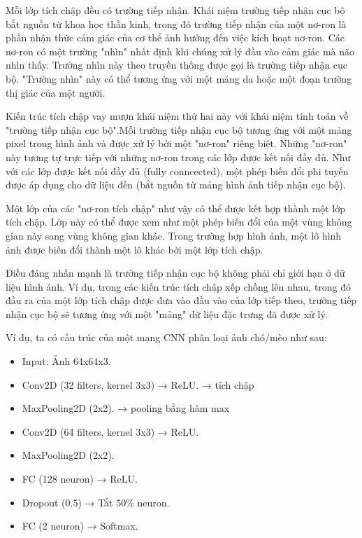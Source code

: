 \documentclass[../main.tex]{subfiles}
\begin{document}
Mỗi lớp tích chập đều có trường tiếp nhận. Khái niệm trường tiếp nhận cục bộ bắt nguồn từ khoa học thần kinh, trong đó trường tiếp nhận của một nơ-ron là phần nhận thức cảm giác của cơ thể ảnh hưởng đến việc kích hoạt nơ-ron. Các nơ-ron có một trường "nhìn" nhất định khi chúng xử lý đầu vào cảm giác mà não nhìn thấy. Trường nhìn này theo truyền thống được gọi là trường tiếp nhận cục bộ. "Trường nhìn" này có thể tương ứng với một mảng da hoặc một đoạn trường thị giác của một người.

Kiến trúc tích chập vay mượn khái niệm thứ hai này với khái niệm tính toán về "trường tiếp nhận cục bộ".Mỗi trường tiếp nhận cục bộ tương ứng với một mảng pixel trong hình ảnh và được xử lý bởi một "nơ-ron" riêng biệt. Những "nơ-ron" này tương tự trực tiếp với những nơ-ron trong các lớp được kết nối đầy đủ. Như với các lớp được kết nối đầy đủ (fully conncected), một phép biến đổi phi tuyến được áp dụng cho dữ liệu đến (bắt nguồn từ mảng hình ảnh tiếp nhận cục bộ).

Một lớp của các "nơ-ron tích chập" như vậy có thể được kết hợp thành một lớp tích chập. Lớp này có thể được xem như một phép biến đổi của một vùng không gian này sang vùng không gian khác. Trong trường hợp hình ảnh, một lô hình ảnh được biến đổi thành một lô khác bởi một lớp tích chập.

Điều đáng nhấn mạnh là trường tiếp nhận cục bộ không phải chỉ giới hạn ở dữ liệu hình ảnh. Ví dụ, trong các kiến trúc tích chập xếp chồng lên nhau, trong đó đầu ra của một lớp tích chập được đưa vào đầu vào của lớp tiếp theo, trường tiếp nhận cục bộ sẽ tương ứng với một "mảng" dữ liệu đặc trưng đã được xử lý.

Ví dụ, ta có cấu trúc của một mạng CNN phân loại ảnh chó/mèo như sau:

\begin{itemize}
    \item Input: Ảnh 64x64x3.
    \item Conv2D (32 filters, kernel 3x3) → ReLU. → tích chập
    \item MaxPooling2D (2x2). → pooling bằng hàm max
    \item Conv2D (64 filters, kernel 3x3) → ReLU.
    \item MaxPooling2D (2x2).
    \item FC (128 neuron) → ReLU.
    \item Dropout (0.5) → Tắt 50\% neuron.
    \item FC (2 neuron) → Softmax.
\end{itemize}
\end{document}
